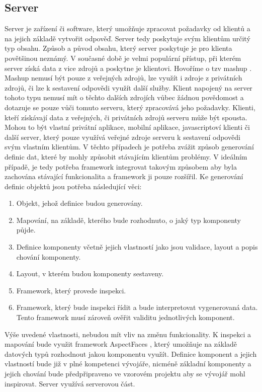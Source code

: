 \subsection{Server}
Server je zařízení či software, který umožňuje zpracovat požadavky od klientů a na jejich základě vytvořit odpověď. Server tedy poskytuje svým klientům určitý typ obsahu. Způsob a původ obsahu, který server poskytuje je pro klienta povětšinou neznámý. V současné době je velmi populární přístup, při kterém server získá data z vice zdrojů a poskytne je klientovi. Hovoříme o tzv mashup \cite{Tuchinda2008}. Mashup nemusí být pouze z veřejných zdrojů, lze využít i zdroje z privátních zdrojů, či lze k sestavení odpovědi využít další služby. Klient napojený na server tohoto typu nemusí mít o těchto dalších zdrojích vůbec žádnou povědomost a dotazuje se pouze vůči tomuto serveru, který zpracovává jeho požadavky. 
Klienti, kteří získávají data z veřejných, či privátních zdrojů serveru může být spousta. Mohou to být vlastní privátní aplikace, mobilní aplikace, javascriptoví klienti či další server, který pouze využívá veřejné zdroje serveru k sestavení odpovědi svým vlastním klientům. V těchto případech je potřeba zvážit způsob generování definic dat, které by mohly způsobit stávajícím klientům problémy. V ideálním případě, je tedy potřeba framework integrovat takovým způsobem aby byla zachována stávající funkcionalita a framework ji pouze rozšířil. 
Ke generování definic objektů jsou potřeba následující věci:
\begin{enumerate}
\item Objekt, jehož definice budou generovány.
\item Mapování, na základě, kterého bude rozhodnuto, o jaký typ komponenty půjde.
\item Definice komponenty včetně jejich vlastností jako jsou validace, layout a popis chování komponenty.
\item Layout, v kterém budou komponenty sestaveny.
\item Framework, který provede inspekci.
\item Framework, který bude inspekci řídit a bude interpretovat vygenerovaná data. Tento framework musí zároveň ověřit validitu jednotlivých komponent.
\end{enumerate}

Výše uvedené vlastnosti, nebudou mít vliv na změnu funkcionality. K inspekci a mapování bude využit framework AspectFaces \cite{aspectFaces}, který umožňuje na základě datových typů rozhodnout jakou komponentu využít. Definice komponent a jejich vlastností bude již v plné kompetenci vývojáře, nicméně základní komponenty a jejich chování bude předpřipraveno ve vzorovém projektu aby se vývojář mohl inspirovat.
Server využívá serverovou část.


